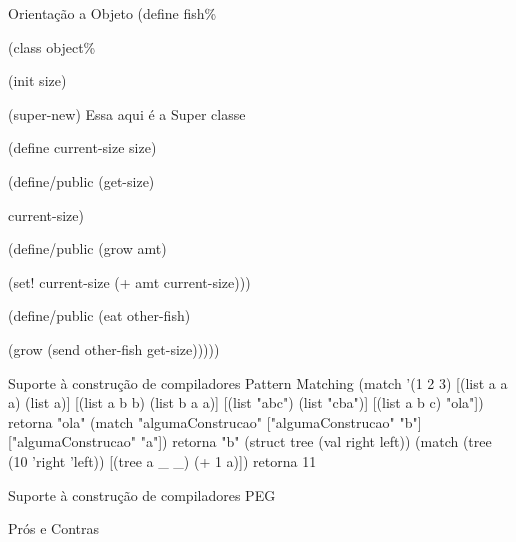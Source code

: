 \documentclass{beamer}
\begin{document}
\begin{frame}{Orientação a Objeto}
(define fish\%

  (class object\%
  
    (init size) 
    
    (super-new) Essa aqui é a Super classe
    
    (define current-size size)
    
    (define/public (get-size)
    
      current-size)
      
    (define/public (grow amt)
    
      (set! current-size (+ amt current-size)))
      
    (define/public (eat other-fish)
    
      (grow (send other-fish get-size)))))


\end{frame}
\begin{frame}{Suporte à construção de compiladores}
Pattern Matching
(match '(1 2 3) 
      [(list a a a) (list a)]
      [(list a b b) (list b a a)]
      [(list "abc") (list "cba")]
      [(list a b c) "ola"]) retorna "ola"
 (match "algumaConstrucao" ["algumaConstrucao" "b"] ["algumaConstrucao" "a"]) retorna "b"
 (struct tree (val right left))
 (match (tree (10 'right 'left)) [(tree a _ _) (+ 1 a)]) retorna 11
\end{frame}


\begin{frame}{Suporte à construção de compiladores}
PEG

\end{frame}


\begin{frame}{Prós e Contras}

\end{frame}
\end{document}
